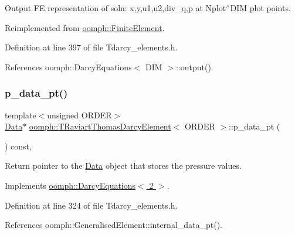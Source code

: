 Output FE representation of soln\+: x,y,u1,u2,div\+\_\+q,p at Nplot$^\wedge$\+D\+IM plot points. 



Reimplemented from \hyperlink{classoomph_1_1FiniteElement_afa9d9b2670f999b43e6679c9dd28c457}{oomph\+::\+Finite\+Element}.



Definition at line 397 of file Tdarcy\+\_\+elements.\+h.



References oomph\+::\+Darcy\+Equations$<$ D\+I\+M $>$\+::output().

\mbox{\label{classoomph_1_1TRaviartThomasDarcyElement_a2cd258057e61232e3e29238faae7d315}} 
\subsubsection{\texorpdfstring{p\+\_\+data\+\_\+pt()}{p\_data\_pt()}}
{\footnotesize\ttfamily template$<$unsigned O\+R\+D\+ER$>$ \\
\hyperlink{classoomph_1_1Data}{Data}$\ast$ \hyperlink{classoomph_1_1TRaviartThomasDarcyElement}{oomph\+::\+T\+Raviart\+Thomas\+Darcy\+Element}$<$ O\+R\+D\+ER $>$\+::p\+\_\+data\+\_\+pt (\begin{DoxyParamCaption}{ }\end{DoxyParamCaption}) const\hspace{0.3cm}{\ttfamily [inline]}, {\ttfamily [virtual]}}



Return pointer to the \hyperlink{classoomph_1_1Data}{Data} object that stores the pressure values. 



Implements \hyperlink{classoomph_1_1DarcyEquations_adf8414eb7fe79be0adf62d26e1b361fb}{oomph\+::\+Darcy\+Equations$<$ 2 $>$}.



Definition at line 324 of file Tdarcy\+\_\+elements.\+h.



References oomph\+::\+Generalised\+Element\+::internal\+\_\+data\+\_\+pt().

\mbox{\label{classoomph_1_1TRaviartThomasDarcyElement_af52ce439c8374c3396bb0e7f7a532ca8}} 
